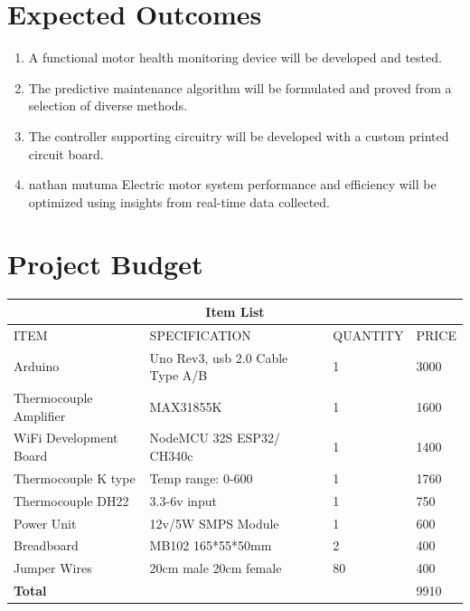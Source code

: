 \section{Expected Outcomes}
\begin{enumerate}
\item A functional motor health monitoring device will be developed and tested.
\item The predictive maintenance algorithm will be formulated and proved from a selection
of diverse methods.
\item The controller supporting circuitry will be developed with a custom printed circuit
board.
\item nathan mutuma Electric motor system performance and efficiency will be optimized using insights from real-time data collected.
\end{enumerate}
\newpage
\section{Project Budget}
\setlength{\arrayrulewidth}{0.5mm}
\setlength{\tabcolsep}{18pt}
\renewcommand{\arraystretch}{1.5}
	\begin{tabular}{ |p{3cm}|p{3cm}|p{3cm}|p{3cm}|  }
		\hline
		\multicolumn{4}{|c|}{\textbf{Item List}} \\
		\hline
		ITEM & SPECIFICATION & QUANTITY & PRICE \\
		\hline
		Arduino & Uno Rev3, usb 2.0 Cable Type A/B & 1 & 3000 \\
		\hline
		Thermocouple Amplifier & MAX31855K & 1 & 1600 \\
		\hline
		WiFi Development Board & NodeMCU 32S ESP32/ CH340c  & 1 & 1400 \\
		\hline
		Thermocouple K type&Temp range: 0-600  & 1 & 1760\\
		\hline
		Thermocouple DH22 & 3.3-6v input  & 1 &750 \\
		\hline
		Power Unit & 12v/5W SMPS Module & 1   & 600\\
		\hline
		Breadboard & MB102  165*55*50mm & 2 & 400 \\
		\hline
		Jumper Wires & 20cm male 20cm female & 80 & 400 \\
		\hline
		\textbf{Total} & & &9910 \\
		\hline
	\end{tabular}

